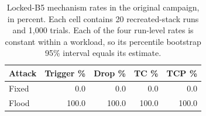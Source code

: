 \begin{table}[t]
\centering
\caption{Locked-B5 mechanism rates in the original campaign, in percent. Each cell contains 20 recreated-stack runs and 1,000 trials. Each of the four run-level rates is constant within a workload, so its percentile bootstrap 95\% interval equals its estimate.}
\label{tab:rq4-mechanism}
\begingroup\fontsize{9}{10.8}\selectfont
\setlength{\tabcolsep}{3pt}
\begin{tabular}{lrrrr}
\hline
Attack & Trigger \% & Drop \% & TC \% & TCP \% \\
\hline
Fixed & 0.0 & 0.0 & 0.0 & 0.0 \\
Flood & 100.0 & 100.0 & 100.0 & 100.0 \\
\hline
\end{tabular}
\endgroup
\end{table}
